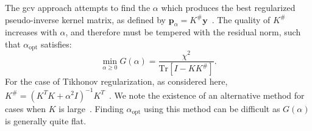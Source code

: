 The \gls{gcv} approach attempts to find the $\alpha$ which produces the best regularized pseudo-inverse kernel matrix, as defined by $\mathbf{p}_\alpha = K^\#\mathbf{y}$~\cite{1978-Craven-NM-31-377}. The quality of $K^\#$ increases with $\alpha$, and therefore must be tempered with the residual norm, such that $\alpha_\mathrm{opt}$ satisfies: 
%
\begin{equation}
\label{eq:gcv}
   \min_{\alpha \geq 0} G ( \alpha ) = \frac{ \chi^2 }{\mathrm{Tr} \left [ I - K K^\# \right]}.
\end{equation}
%
For the case of Tikhonov regularization, as considered here, $K^\# = \left ( K^T K + \alpha^2 I \right )^{-1} K^{T}$~\cite{Zou2016}. We note the existence of an alternative method for cases when $K$ is large~\cite{1997-Golub-JCGS-6-1}. Finding $\alpha_\mathrm{opt}$ using this method can be difficult as $G ( \alpha )$ is generally quite flat.